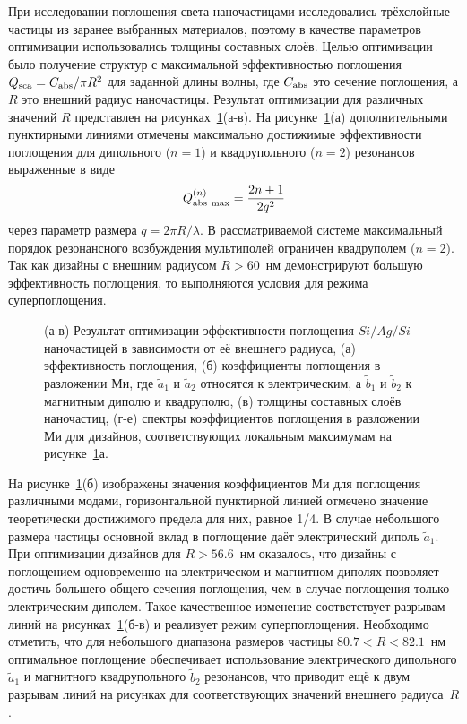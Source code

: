 При исследовании поглощения света наночастицами исследовались
трёхслойные частицы из заранее выбранных материалов, поэтому в
качестве параметров оптимизации использовались толщины составных
слоёв.  Целью оптимизации было получение структур с максимальной
эффективностью поглощения $Q_{\rm sca} = C_{\rm abs}/\pi R^2$ для
заданной длины волны, где $C_{\rm abs}$ это сечение поглощения, а $R$
это внешний радиус наночастицы.  Результат оптимизации для различных
значений $R$ представлен на рисунках~\ref{img:q-abs}(а-в). На
рисунке~\ref{img:q-abs}(а) дополнительными пунктирными линиями
отмечены максимально достижимые эффективности поглощения для
дипольного ($n=1$) и квадрупольного ($n=2$) резонансов выраженные в
виде~\cite{Tribelsky-2011}
$$Q^{(n)}_{\rm  abs\ max}=\frac{2n+1}{2q^2}$$
через параметр размера $q=2\pi R/\lambda$.  В рассматриваемой системе
максимальный порядок резонансного возбуждения мультиполей ограничен
квадруполем ($n=2$). Так как дизайны с внешним радиусом $R>60$~нм
демонстрируют большую эффективность поглощения, то выполняются условия
для режима суперпоглощения.

\begin{figure}[t]
  \begin{minipage}[ht]{0.495\linewidth}
  \end{minipage}
  \hfill
  \begin{minipage}[ht]{0.495\linewidth}
  \end{minipage}
  \caption{ (а-в) Результат оптимизации эффективности поглощения
    $Si/Ag/Si$ наночастицей в зависимости от её внешнего радиуса, (а)
    эффективность поглощения, (б) коэффициенты поглощения в разложении
    Ми, где $\tilde{a}_1$ и $\tilde{a}_2$ относятся к электрическим, а
    $\tilde{b}_1$ и $\tilde{b}_2$ к магнитным диполю и квадруполю, (в)
    толщины составных слоёв наночастиц, (г-е) спектры коэффициентов
    поглощения в разложении Ми для дизайнов, соответствующих локальным
    максимумам на рисунке~\ref{img:q-abs}а.}
  \label{img:q-abs}  
\end{figure}


На рисунке~\ref{img:q-abs}(б) изображены значения коэффициентов Ми для
поглощения различными модами, горизонтальной пунктирной линией
отмечено значение теоретически достижимого предела для них, равное
1/4. В случае небольшого размера частицы основной вклад в поглощение
даёт электрический диполь $\tilde{a}_1$.  При оптимизации дизайнов для
$R > 56.6$~нм оказалось, что дизайны с поглощением одновременно на
электрическом и магнитном диполях позволяет достичь большего общего
сечения поглощения, чем в случае поглощения только электрическим
диполем. Такое качественное изменение соответствует разрывам линий на
рисунках~\ref{img:q-abs}(б-в) и реализует режим суперпоглощения.
Необходимо отметить, что для небольшого диапазона размеров частицы
$80.7<R<82.1$~нм оптимальное поглощение обеспечивает использование
электрического дипольного $\tilde{a}_1$ и магнитного квадрупольного
$\tilde{b}_2$ резонансов, что приводит ещё к двум разрывам линий на
рисунках для соответствующих значений внешнего радиуса~$R$.

